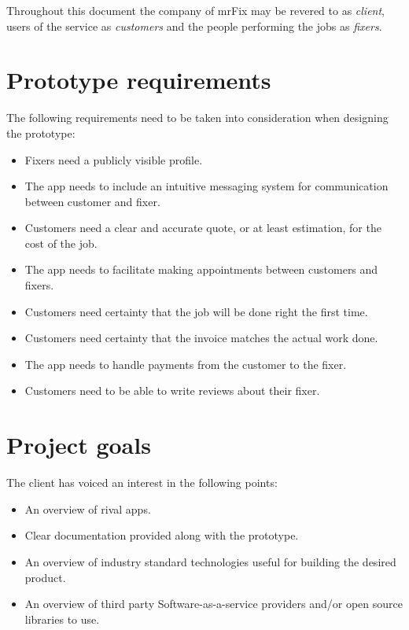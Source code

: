 \documentclass[11pt]{article}
\begin{document}
Throughout this document the company of mrFix may be revered to as \textit{client}, users 
of the service as \textit{customers} and the people performing the jobs as 
\textit{fixers}.

\section{Prototype requirements}

The following requirements need to be taken into consideration when designing the 
prototype: 

\begin{itemize}
	\item Fixers need a publicly visible profile.
	\item The app needs to include an intuitive messaging system for communication between 
		customer and fixer.
	\item Customers need a clear and accurate quote, or at least estimation, for the cost 
		of the job.
	\item The app needs to facilitate making appointments between customers and fixers.
	\item Customers need certainty that the job will be done right the first time.
	\item Customers need certainty that the invoice matches the actual work done.
	\item The app needs to handle payments from the customer to the fixer.
	\item Customers need to be able to write reviews about their fixer.
\end{itemize}

\section{Project goals}

The client has voiced an interest in the following points: 

\begin{itemize}
	\item An overview of rival apps.
	\item Clear documentation provided along with the prototype.
	\item An overview of industry standard technologies useful for building the desired 
		product.
	\item An overview of third party Software-as-a-service providers and/or open source 
		libraries to use.
\end{itemize}
\end{document}
